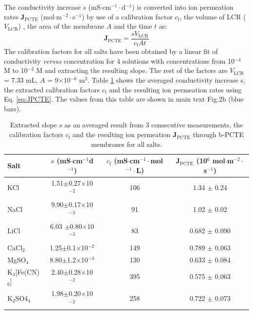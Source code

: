 \documentclass[manuscript=suppinfo,email=true, hyperref=true, keywords=false]{achemso}
\newcommand{\Fig}{Fig.}
\begin{document}
The conductivity increase $s$ (mS$\cdot$cm$^{-1}\cdot$d$^{-1}$) is
converted into ion permeation rates $\boldsymbol{J}_{\mathrm{PCTE}}$
(mol$\cdot$m$^{-2}\cdot$s$^{-1}$) by use of a calibration factor
$c_{\mathrm{f}}$, the volume of LCR ($V_{\mathrm{LCR}}$) , the area of
the membrane $A$ and the time $t$ as:
\begin{equation}
  \label{eq:JPCTE}
  \boldsymbol{J}_{\mathrm{PCTE}} = \frac{s V_{\mathrm{LCR}}}{c_{\mathrm{f}} A t}
\end{equation}
The calibration factors for all salts have been obtained by a linear
fit of conductivity \textit{versus} concentration for 4 solutions with
concentrations from 10$^{-4}$ M to 10$^{-2}$ M and extracting the
resulting slope. The rest of the factors are $V_{\mathrm{LCR}}$ = 7.33
mL, $A$ = 9$\times$10$^{-6}$ m$^{2}$. Table \ref{tab:exp-2} shows the
averaged conductivity increase s, the extracted calibration factors
$c_{\mathrm{f}}$ and the resulting ion permeation rates using
Eq. \ref{eq:JPCTE}. The values from this table are shown in main text \Fig 2b
(blue bars).
\begin{table}[htbp]
  \centering
  \begin{tabular}{lccc}
    \hline
    Salt & $s$ (mS$\cdot$cm$^{-1}$d$^{-1}$) & $c_{\mathrm{f}}$ (mS$\cdot$cm$^{-1}\cdot$mol$^{-1}\cdot$L) &
                                                                                                            $\boldsymbol{J}_{\mathrm{PCTE}}$ (10$^{6}$ mol$\cdot$m$^{-2}\cdot$s$^{-1}$)\\
    \hline
    KCl & 1.51$\pm$0.27$\times$10$^{-2}$  & 106   & 1.34 $\pm$ 0.24\\
    NaCl        & 9.90$\pm$0.17$\times$10$^{-3}$ & 91    & 1.02 $\pm$ 0.02\\
    LiCl        & 6.03 $\pm$0.80$\times$10$^{-3}$        & 83    & 0.682 $\pm$ 0.090\\
    CaCl$_{2}$  & 1.25$\pm$0.1$\times$10$^{-2}$    & 149   & 0.789 $\pm$ 0.063\\
    MgSO$_{4}$  & 8.80$\pm$1.2$\times$10$^{-3}$   & 130   & 0.633 $\pm$ 0.084\\
    K$_{3}$[Fe(CN)$_{6}]$ & 2.40$\pm$0.28$\times$10$^{-2}$   & 395   & 0.575 $\pm$ 0.063\\
    K$_{2}$SO4$_{4}$    & 1.98$\pm$0.20$\times$10$^{-2}$  & 258   & 0.722 $\pm$ 0.073\\
    \hline
  \end{tabular}
  \caption{Extracted slope $s$ as an averaged result from 3 consecutive
    measurements, the calibration factors $c_{\mathrm{f}}$ and the resulting ion
    permeation $\boldsymbol{J}_{\mathrm{PCTE}}$ through b-PCTE membranes for all salts.}
  \label{tab:exp-2}
\end{table}
\end{document}
